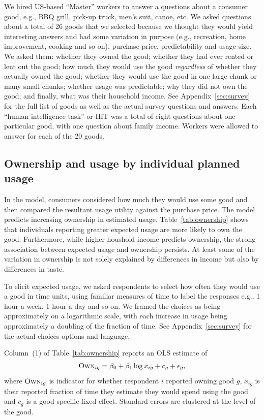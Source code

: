 \documentclass[11pt]{article}
\begin{document}
We hired US-based ``Master'' workers to answer a questions about a consumer good, e.g., BBQ grill, pick-up truck, men's suit, canoe, etc.
We asked questions about a total of 26 goods that we selected because we thought they would yield interesting answers and had some variation in purpose (e.g., recreation, home improvement, cooking and so on), purchase price, predictability and usage size. 
We asked them: whether they owned the good; whether they had ever rented or lent out the good; how much they would use the good \emph{regardless} of whether they actually owned the good; whether they would use the good in one large chunk or many small chunks; whether usage was predictable; why they did not own the good; and finally, what was their household income. 
See Appendix~\ref{sec:survey} for the full list of goods as well as the actual survey questions and answers.  
Each ``human intelligence task'' or HIT was a total of eight questions about one particular good, with one question about family income. 
Workers were allowed to answer for each of the 20 goods.  


\subsection{Ownership and usage by individual planned usage} 
In the model, consumers considered how much they would use some good and then compared the resultant usage utility against the purchase price. 
The model predicts increasing ownership in estimated usage.
Table~\ref{tab:ownership} shows that individuals reporting greater expected usage are more likely to own the good.
Furthermore, while higher houshold income predicts ownership, the strong association between expected usage and ownership persists.
At least some of the variation in ownership is not solely explained by differences in income but also by differences in taste. 

To elicit expected usage, we asked respondents to select how often they would use a good in time units, using familiar measures of time to label the responses e.g., 1 hour a week, 1 hour a day and so on.
We framed the choices as being approximately on a logarithmic scale, with each increase in usage being approximately a doubling of the fraction of time.
See Appendix~\ref{sec:survey} for the actual choices options and language.

Column~(1) of Table~\ref{tab:ownership} reports an OLS estimate of 
\begin{align} \label{eq:base_own}
\textsc{Own}_{ig} = \beta_0 + \beta_1 \log x_{ig} + c_{g} + \epsilon_{g}, 
\end{align}
where $\textsc{Own}_{ig}$ is indicator for whether respondent $i$ reported owning good $g$, $x_{ig}$ is their reported fraction of time they estimate they would spend using the good and $c_g$ is a good-specific fixed effect.
Standard errors are clustered at the level of the good. 
\end{document}
